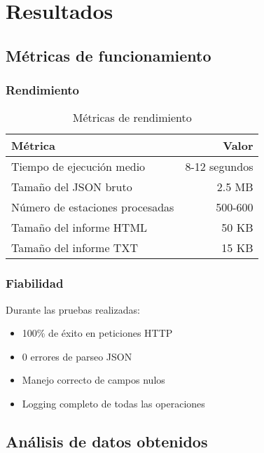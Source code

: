 \chapter{Resultados}

\section{Métricas de funcionamiento}

\subsection{Rendimiento}

\begin{table}[H]
  \centering
  \begin{tabular}{@{}lr@{}}
    \toprule
    \textbf{Métrica}                & \textbf{Valor} \\ \midrule
    Tiempo de ejecución medio       & 8-12 segundos  \\
    Tamaño del JSON bruto           & ~2.5 MB        \\
    Número de estaciones procesadas & ~500-600       \\
    Tamaño del informe HTML         & ~50 KB         \\
    Tamaño del informe TXT          & ~15 KB         \\ \bottomrule
  \end{tabular}
  \caption{Métricas de rendimiento}
  \label{tab:metricas}
\end{table}

\subsection{Fiabilidad}

Durante las pruebas realizadas:
\begin{itemize}
  \item 100\% de éxito en peticiones HTTP
  \item 0 errores de parseo JSON
  \item Manejo correcto de campos nulos
  \item Logging completo de todas las operaciones
\end{itemize}

\section{Análisis de datos obtenidos}

